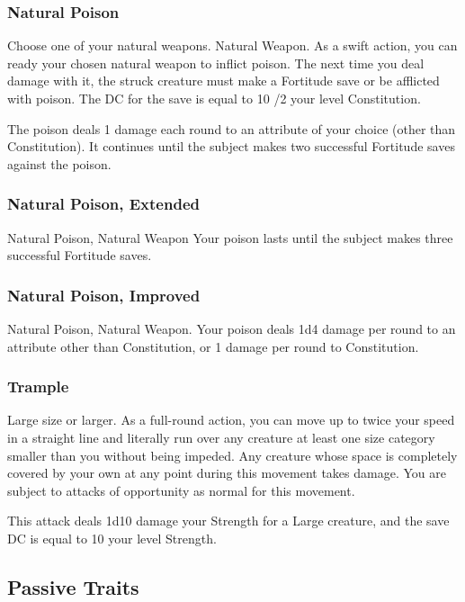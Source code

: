 \subsubsection{Natural Poison}
Choose one of your natural weapons.
\featpre Natural Weapon.
\featben As a swift action, you can ready your chosen natural weapon to inflict poison. The next time you deal damage with it, the struck creature must make a Fortitude save or be afflicted with poison. The DC for the save is equal to 10 /2 your level \add Constitution.
\par The poison deals 1 damage each round to an attribute of your choice (other than Constitution). It continues until the subject makes two successful Fortitude saves against the poison.

\subsubsection{Natural Poison, Extended}
\featpre Natural Poison, Natural Weapon
\featben Your poison lasts until the subject makes three successful Fortitude saves.

\subsubsection{Natural Poison, Improved}
\featpre Natural Poison, Natural Weapon.
\featben Your poison deals 1d4 damage per round to an attribute other than Constitution, or 1 damage per round to Constitution.

\subsubsection{Trample}
\featpre Large size or larger.
\featben As a full-round action, you can move up to twice your speed in a straight line and literally run over any creature at least one size category smaller than you without being impeded. Any creature whose space is completely covered by your own at any point during this movement takes damage. You are subject to attacks of opportunity as normal for this movement.

This attack deals 1d10 damage \add your Strength for a Large creature, and the save DC is equal to 10 \add your level \add Strength.

\subsection{Passive Traits}

